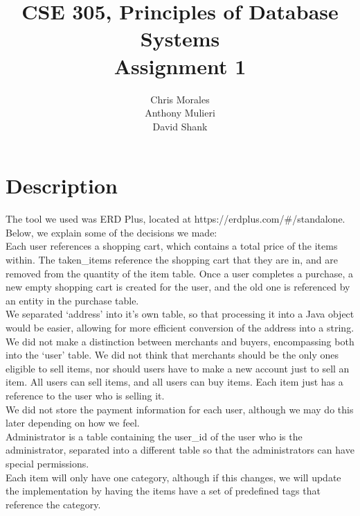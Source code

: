 \documentclass{article}[12pt]
\title{CSE 305, Principles of Database Systems \\ Assignment 1}
\author{Chris Morales\\Anthony Mulieri\\David Shank
\bigskip
}
\begin{document}
\doublespacing\maketitle

\newpage
\section*{Description}
The tool we used was ERD Plus, located at https://erdplus.com/\#/standalone.\\
Below, we explain some of the decisions we made:\\
Each user references a shopping cart, which contains a total price of the items within. The
taken\_items reference the shopping cart that they are in, and are removed from the quantity of the
item table. Once a user completes a purchase, a new empty shopping cart is created for the user, and
the old one is referenced by an entity in the purchase table.\\
We separated ‘address’ into it’s own table, so that processing it into a Java object would be
easier, allowing for more efficient conversion of the address into a string.\\
We did not make a distinction between merchants and buyers, encompassing both into the ‘user’ table.
We did not think that merchants should be the only ones eligible to sell items, nor should users
have to make a new account just to sell an item. All users can sell items, and all users can buy
items. Each item just has a reference to the user who is selling it.\\
We did not store the payment information for each user, although we may do this later depending on
how we feel.\\
Administrator is a table containing the user\_id of the user who is the administrator, separated into
a different table so that the administrators can have special permissions.\\
Each item will only have one category, although if this changes, we will update the implementation
by having the items have a set of predefined tags that reference the category.\\
\newpage
\end{document}
